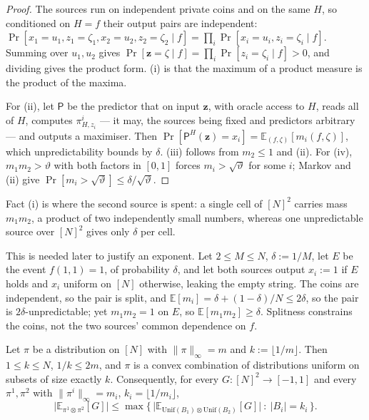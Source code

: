 \documentclass{aicr-solution}
\newcommand{\Prob}[1]{\Pr\!\left[#1\right]}
\newcommand{\Exp}{\mathbb{E}}
\newcommand{\vz}{\mathbf{z}}
\newcommand{\Unif}{\mathrm{Unif}}
\begin{document}
\begin{proof}
The sources run on independent private coins and on the same $H$, so conditioned on
$H = f$ their output pairs are independent:
$\Prob{x_1 = u_1, z_1 = \zeta_1, x_2 = u_2, z_2 = \zeta_2 \mid f}
 = \prod_i \Prob{x_i = u_i, z_i = \zeta_i \mid f}$.
Summing over $u_1,u_2$ gives
$\Prob{\vz = \zeta \mid f} = \prod_i \Prob{z_i = \zeta_i \mid f} > 0$, and dividing
gives the product form. (i) is that the maximum of a product measure is the product
of the maxima.

For (ii), let $\mathsf{P}$ be the predictor that on input $\vz$, with oracle access
to $H$, reads all of $H$, computes $\pi^{i}_{H,z_i}$ --- it may, the sources being
fixed and predictors arbitrary --- and outputs a maximiser. Then
$\Prob{\mathsf{P}^{H}(\vz) = x_i} = \Exp_{(f,\zeta)}[m_i(f,\zeta)]$, which
unpredictability bounds by $\delta$. (iii) follows from $m_2 \le 1$ and (ii). For
(iv), $m_1m_2 > \vartheta$ with both factors in $[0,1]$ forces
$m_i > \sqrt{\vartheta}$ for some $i$; Markov and (ii) give
$\Prob{m_i > \sqrt{\vartheta}} \le \delta/\sqrt{\vartheta}$.
\end{proof}

Fact (i) is where the second source is spent: a single cell of $[N]^{2}$ carries
mass $m_1m_2$, a product of two independently small numbers, whereas one
unpredictable source over $[N]^{2}$ gives only $\delta$ per cell.

\begin{remark}[{$\Exp[m_1m_2] \le \delta^{2}$ is false}]\label{rem:m1m2}
This is needed later to justify an exponent. Let $2 \le M \le N$, $\delta := 1/M$,
let $E$ be the event $f(1,1) = 1$, of probability $\delta$, and let both sources
output $x_i := 1$ if $E$ holds and $x_i$ uniform on $[N]$ otherwise, leaking the
empty string. The coins are independent, so the pair is split, and
$\Exp[m_i] = \delta + (1-\delta)/N \le 2\delta$, so the pair is
$2\delta$-unpredictable; yet $m_1m_2 = 1$ on $E$, so $\Exp[m_1m_2] \ge \delta$.
Splitness constrains the coins, not the two sources' common dependence on $f$.
\end{remark}

\begin{lemma}[flattening]\label{lem:2}
Let $\pi$ be a distribution on $[N]$ with $\|\pi\|_\infty = m$ and
$k := \lfloor 1/m \rfloor$. Then $1 \le k \le N$, $1/k \le 2m$, and $\pi$ is a
convex combination of distributions uniform on subsets of size exactly $k$.
Consequently, for every $G : [N]^{2} \to [-1,1]$ and every $\pi^{1},\pi^{2}$ with
$\|\pi^{i}\|_\infty = m_i$, $k_i = \lfloor 1/m_i \rfloor$,
\[
  \bigl|\Exp_{\pi^{1} \otimes \pi^{2}}[G]\bigr| \le
  \max\bigl\{\, \bigl|\Exp_{\Unif(B_1) \otimes \Unif(B_2)}[G]\bigr|
  \ :\ |B_i| = k_i \,\bigr\}.
\]
\end{lemma}
\end{document}
